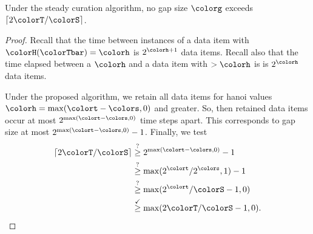 \begin{theorem}
\label{thm:steady-gap-size}
Under the steady curation algorithm, no gap size $\colorg$ exceeds $\left\lceil 2 \colorT / \colorS \right\rceil$.
\end{theorem}
\begin{proof}
Recall that the time between instances of a data item with \hv{} $\colorH(\colorTbar) = \colorh$ is $2^{\colorh + 1}$ data items.
Recall also that the time elapsed between a \hv{} $\colorh$ and a data item with \hv{} $>\colorh$ is is $2^{\colorh}$ data items.

Under the proposed algorithm, we retain all data items for hanoi values $\colorh = \max (\colort - \colors, 0)$ and greater.
So, then retained data items occur at most $2^{\max(\colort - \colors, 0)}$ time steps apart.
This corresponds to gap size at most $2^{\max(\colort - \colors, 0)} - 1$.
Finally, we test
\begin{align*}
\left\lceil 2 \colorT / \colorS \right\rceil
&\stackrel{?}{\geq}
2^{\max(\colort - \colors, 0)} - 1\\
&\stackrel{?}{\geq}
\max(2^{\colort} / 2^{\colors}, 1) - 1\\
&\stackrel{?}{\geq}
\max(2^{\colort} / \colorS - 1, 0)\\
&\stackrel{\checkmark}{\geq}
\max(2\colorT / \colorS - 1, 0).
\end{align*}
\end{proof}




